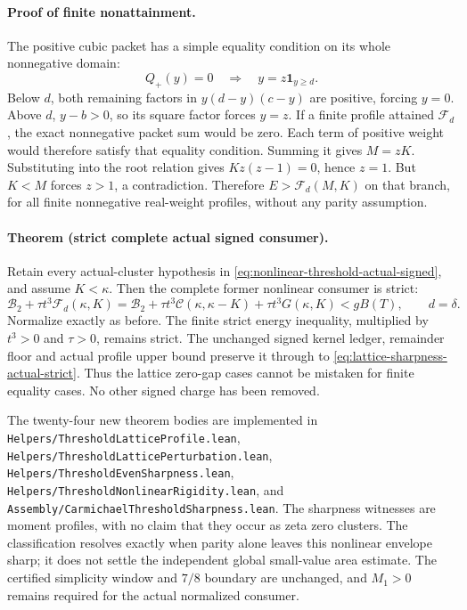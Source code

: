 \paragraph{Proof of finite nonattainment.}
The positive cubic packet has a simple equality condition on its whole
nonnegative domain:
\[
 Q_+(y)=0\quad\Longrightarrow\quad y=z\mathbf1_{y\ge d}.
\]
Below \(d\), both remaining factors in \(y(d-y)(c-y)\) are positive,
forcing \(y=0\).  Above \(d\), \(y-b>0\), so its square factor forces
\(y=z\).  If a finite profile attained \(\mathcal F_d\), the exact
nonnegative packet sum would be zero.  Each term of positive weight would
therefore satisfy that equality condition.  Summing it gives \(M=zK\).
Substituting into the root relation gives
\(Kz(z-1)=0\), hence \(z=1\).  But \(K<M\) forces \(z>1\), a
contradiction.  Therefore \(E>\mathcal F_d(M,K)\) on that branch, for
all finite nonnegative real-weight profiles, without any parity assumption.

\paragraph{Theorem (strict complete actual signed consumer).}
Retain every actual-cluster hypothesis in
\eqref{eq:nonlinear-threshold-actual-signed}, and assume \(K<\kappa\).
Then the complete former nonlinear consumer is strict:
\begin{equation}
 \mathcal B_2+\tau t^3\mathcal F_d(\kappa,K)
 =\mathcal B_2+\tau t^3\mathcal C(\kappa,\kappa-K)
   +\tau t^3G(\kappa,K)<gB(T),\qquad d=\delta.
 \label{eq:lattice-sharpness-actual-strict}
\end{equation}
Normalize exactly as before.  The finite strict energy inequality, multiplied
by \(t^3>0\) and \(\tau>0\), remains strict.  The unchanged signed kernel
ledger, remainder floor and actual profile upper bound preserve it through
to \eqref{eq:lattice-sharpness-actual-strict}.  Thus the lattice zero-gap
cases cannot be mistaken for finite equality cases.  No other signed charge
has been removed.

The twenty-four new theorem bodies are implemented in
\texttt{Helpers/ThresholdLatticeProfile.lean},
\texttt{Helpers/ThresholdLatticePerturbation.lean},
\texttt{Helpers/ThresholdEvenSharpness.lean},
\texttt{Helpers/ThresholdNonlinearRigidity.lean}, and
\texttt{Assembly/CarmichaelThresholdSharpness.lean}.
The sharpness witnesses are moment profiles, with no claim that they occur
as zeta zero clusters.  The classification resolves exactly when parity
alone leaves this nonlinear envelope sharp; it does not settle the independent
global small-value area estimate.  The certified simplicity window and
\(7/8\) boundary are unchanged, and \(M_1>0\) remains required for the
actual normalized consumer.

